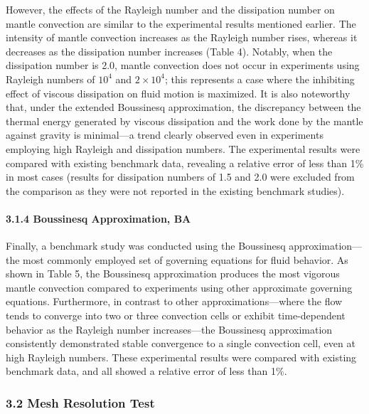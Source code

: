 However, the effects of the Rayleigh number and the dissipation number on mantle convection are similar to the experimental results mentioned earlier. The intensity of mantle convection increases as the Rayleigh number rises, whereas it decreases as the dissipation number increases (Table 4). Notably, when the dissipation number is 2.0, mantle convection does not occur in experiments using Rayleigh numbers of $10^4$ and $2 \times 10^4$; this represents a case where the inhibiting effect of viscous dissipation on fluid motion is maximized. It is also noteworthy that, under the extended Boussinesq approximation, the discrepancy between the thermal energy generated by viscous dissipation and the work done by the mantle against gravity is minimal—a trend clearly observed even in experiments employing high Rayleigh and dissipation numbers. The experimental results were compared with existing benchmark data, revealing a relative error of less than 1\% in most cases (results for dissipation numbers of 1.5 and 2.0 
were excluded from the comparison as they were not reported in the existing benchmark studies).


\paragraph{3.1.4 Boussinesq Approximation, BA}

Finally, a benchmark study was conducted using the Boussinesq approximation—the most commonly employed set of governing equations for fluid behavior. As shown in Table 5, the Boussinesq approximation produces the most vigorous mantle convection compared to experiments using other approximate governing equations. Furthermore, in contrast to other approximations—where the flow tends to converge into two or three convection cells or exhibit time-dependent behavior as the Rayleigh number increases—the Boussinesq approximation consistently demonstrated stable convergence to a single convection cell, even at high Rayleigh numbers. These experimental results were compared with existing benchmark data, and all showed a relative error of less than 1\%.

\subsubsection{3.2 Mesh Resolution Test}

